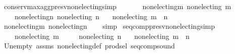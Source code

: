 \begin{isabellebody}
%
\endisatagproof
{\isafoldproof}%
%
\isadelimproof
\isanewline
%
\endisadelimproof
\isanewline
\isanewline
{}\isamarkupfalse%
\ conserv{\isacharunderscore}{\kern0pt}max{\isacharunderscore}{\kern0pt}agg{\isacharunderscore}{\kern0pt}presv{\isacharunderscore}{\kern0pt}non{\isacharunderscore}{\kern0pt}electing{\isacharbrackleft}{\kern0pt}simp{\isacharbrackright}{\kern0pt}{\isacharcolon}{\kern0pt}\isanewline
\ \ \isanewline
\ \ \ \ non{\isacharunderscore}{\kern0pt}electing{\isacharunderscore}{\kern0pt}m{\isacharcolon}{\kern0pt}\ {\isachardoublequoteopen}non{\isacharunderscore}{\kern0pt}electing\ m{\isachardoublequoteclose}\ \isanewline
\ \ \ \ non{\isacharunderscore}{\kern0pt}electing{\isacharunderscore}{\kern0pt}n{\isacharcolon}{\kern0pt}\ {\isachardoublequoteopen}non{\isacharunderscore}{\kern0pt}electing\ n{\isachardoublequoteclose}\isanewline
\ \ \ {\isachardoublequoteopen}non{\isacharunderscore}{\kern0pt}electing\ {\isacharparenleft}{\kern0pt}m\ {\isasymparallel}\isactrlsub {\isasymup}\ n{\isacharparenright}{\kern0pt}{\isachardoublequoteclose}\isanewline
%
\isadelimproof
\ \ %
\endisadelimproof
%
\isatagproof
{}\isamarkupfalse%
\ non{\isacharunderscore}{\kern0pt}electing{\isacharunderscore}{\kern0pt}m\ non{\isacharunderscore}{\kern0pt}electing{\isacharunderscore}{\kern0pt}n\isanewline
\ \ \isamarkupfalse%
\ simp%
\endisatagproof
{\isafoldproof}%
%
\isadelimproof
\isanewline
%
\endisadelimproof
\isanewline
\isanewline
{}\isamarkupfalse%
\ seq{\isacharunderscore}{\kern0pt}comp{\isacharunderscore}{\kern0pt}presv{\isacharunderscore}{\kern0pt}non{\isacharunderscore}{\kern0pt}electing{\isacharbrackleft}{\kern0pt}simp{\isacharbrackright}{\kern0pt}{\isacharcolon}{\kern0pt}\isanewline
\ \ \isanewline
\ \ \ \ {\isachardoublequoteopen}non{\isacharunderscore}{\kern0pt}electing\ m{\isachardoublequoteclose}\ \isanewline
\ \ \ \ {\isachardoublequoteopen}non{\isacharunderscore}{\kern0pt}electing\ n{\isachardoublequoteclose}\isanewline
\ \ \ {\isachardoublequoteopen}non{\isacharunderscore}{\kern0pt}electing\ {\isacharparenleft}{\kern0pt}m\ {\isasymtriangleright}\ n{\isacharparenright}{\kern0pt}{\isachardoublequoteclose}\isanewline
%
\isadelimproof
\ \ %
\endisadelimproof
%
\isatagproof
{}\isamarkupfalse%
\ Un{\isacharunderscore}{\kern0pt}empty\ assms\ non{\isacharunderscore}{\kern0pt}electing{\isacharunderscore}{\kern0pt}def\ prod{\isachardot}{\kern0pt}sel\ seq{\isacharunderscore}{\kern0pt}comp{\isacharunderscore}{\kern0pt}sound\isanewline

\end{isabellebody}
